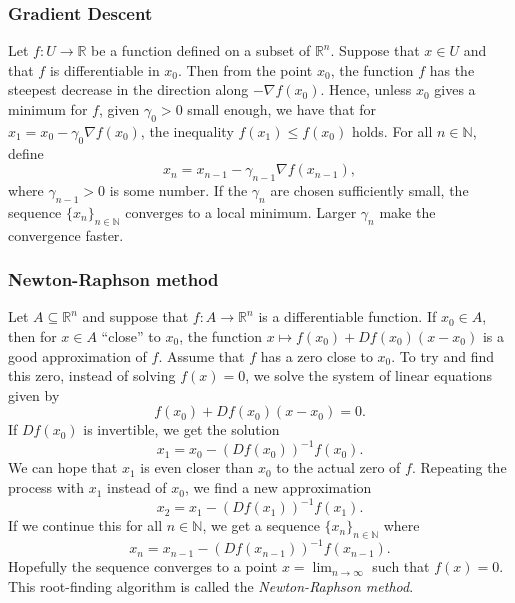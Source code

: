 \subsubsection{Gradient Descent}\label{sec:gradient descent}
Let $f\colon U\to\mathbb{R}$ be a function defined on a subset of $\mathbb{R}^n$. Suppose that $x\in U$ and that $f$ is differentiable in $x_0$. Then from the point $x_0$, the function $f$ has the steepest decrease in the direction along $-\nabla f(x_0)$. Hence, unless $x_0$ gives a minimum for $f$, given $\gamma_0 > 0$ small enough, we have that for $x_1 = x_0 - \gamma_0\nabla f(x_0)$, the inequality $f(x_1)\le f(x_0)$ holds. For all $n\in\mathbb{N}$, define
\begin{equation*}
    x_n = x_{n-1} - \gamma_{n-1}\nabla f(x_{n-1}),
\end{equation*}
where $\gamma_{n-1}>0$ is some number. If the $\gamma_{n}$ are chosen sufficiently small, the sequence $\{x_n\}_{n\in\mathbb{N}}$ converges to a local minimum. Larger $\gamma_{n}$ make the convergence faster.

\subsubsection{Newton-Raphson method}\label{sec:newton-raphson method}

Let $A\subseteq\mathbb{R}^n$ and suppose that $f\colon A \to\mathbb{R}^n$ is a differentiable function. If $x_0\in A$, then for $x\in A$ “close” to $x_0$, the function $x\mapsto f(x_0)+Df(x_0)(x-x_0)$ is a good approximation of $f$. Assume that $f$ has a zero close to $x_0$. To try and find this zero, instead of solving $f(x)=0$, we solve the system of linear equations given by
\begin{equation*}
  f(x_0)+Df(x_0)(x-x_0) = 0.
\end{equation*}
If $Df(x_0)$ is invertible, we get the solution
\begin{equation*}
  x_1=x_0-(Df(x_0))^{-1}f(x_0).
\end{equation*}
We can hope that $x_1$ is even closer than $x_0$ to the actual zero of $f$. Repeating the process with $x_1$ instead of $x_0$, we find a new approximation
\begin{equation*}
  x_2=x_1-(Df(x_1))^{-1}f(x_1).
\end{equation*}
If we continue this for all $n\in\mathbb{N}$, we get a sequence $\{x_n\}_{n\in\mathbb{N}}$ where
\begin{equation*}
  x_n=x_{n-1}-(Df(x_{n-1}))^{-1}f(x_{n-1}).
\end{equation*}
Hopefully the sequence converges to a point $x=\lim_{n\to\infty}$ such that $f(x)=0$. This root-finding algorithm is called the \emph{Newton-Raphson method}.

